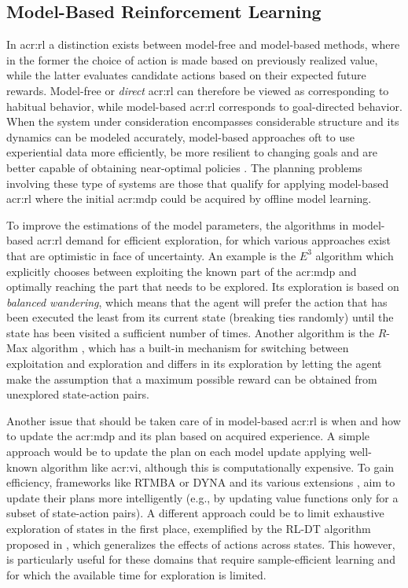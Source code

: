 \subsection{Model-Based Reinforcement Learning}
\label{sec:model-based-reinforcement-learning}

In \acrshort{acr:rl} a distinction exists between model-free and model-based methods, where in the former the choice of action is made based on previously realized value, while the latter evaluates candidate actions based on their expected future rewards.
Model-free or \textit{direct} \acrshort{acr:rl} can therefore be viewed as corresponding to habitual behavior, while model-based \acrshort{acr:rl} corresponds to goal-directed behavior.
When the system under consideration encompasses considerable structure and its dynamics can be modeled accurately, model-based approaches oft to use experiential data more efficiently, be more resilient to changing goals and are better capable of obtaining near-optimal policies \cite{atkeson1997}.
The planning problems involving these type of systems are those that qualify for applying model-based \acrshort{acr:rl} where the initial \acrshort{acr:mdp} could be acquired by offline model learning.

To improve the estimations of the model parameters, the algorithms in model-based \acrshort{acr:rl} demand for efficient exploration, for which various approaches exist that are optimistic in face of uncertainty.
An example is the $E^3$ algorithm \cite{kearns2002near} which explicitly chooses between exploiting the known part of the \acrshort{acr:mdp} and optimally reaching the part that needs to be explored. 
Its exploration is based on \textit{balanced wandering}, which means that the agent will prefer the action that has been executed the least from its current state (breaking ties randomly) until the state has been visited a sufficient number of times.
Another algorithm is the $R$-Max algorithm \cite{Brafman2002}, which has a built-in mechanism for switching between exploitation and exploration and differs in its exploration by letting the agent make the assumption that a maximum possible reward can be obtained from unexplored state-action pairs.

Another issue that should be taken care of in model-based \acrshort{acr:rl} is when and how to update the \acrshort{acr:mdp} and its plan based on acquired experience. A simple approach would be to update the plan on each model update applying well-known algorithm like \acrshort{acr:vi}, although this is computationally expensive.
To gain efficiency, frameworks like \textsc{RTMBA} \cite{hester2012rtmba} or \textsc{DYNA} and its various extensions \cite{silver2008sample}, aim to update their plans more intelligently (e.g., by updating value functions only for a subset of state-action pairs).
A different approach could be to limit exhaustive exploration of states in the first place, exemplified by the \textsc{RL-DT} algorithm proposed in \cite{hester2010generalized}, which generalizes the effects of actions across states.
This however, is particularly useful for these domains that require sample-efficient learning and for which the available time for exploration is limited.

